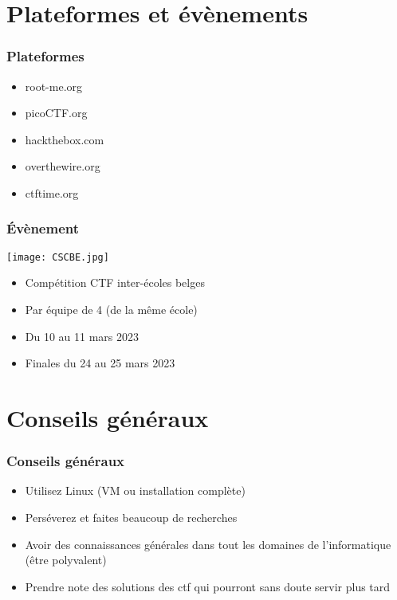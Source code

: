 \documentclass{beamer}
\begin{document}

\section{Plateformes et évènements}

\begin{frame}\frametitle{Plateformes}
    \begin{itemize}
        \item root-me.org
        \item picoCTF.org        
        \item hackthebox.com
        \item overthewire.org
        \item ctftime.org
    \end{itemize}
\end{frame}



\begin{frame}
\frametitle{Évènement}
\begin{center}
    \texttt{[image: CSCBE.jpg]}
\end{center}

\begin{itemize}
    \item Compétition CTF inter-écoles belges\\
    \item Par équipe de 4 (de la même école)\\
    \item Du 10 au 11 mars 2023
    \item Finales du 24 au 25 mars 2023
\end{itemize}

    
\end{frame}

{

}
\section{Conseils généraux}

\begin{frame}
\frametitle{Conseils généraux}

\begin{itemize}
    \item Utilisez Linux (VM ou installation complète)
    \pause
    \item Perséverez et faites beaucoup de recherches
    \pause
    \item Avoir des connaissances générales dans tout les domaines de l'informatique (être polyvalent)
    \pause
    \item Prendre note des solutions des ctf qui pourront sans doute servir plus tard
\end{itemize}

\end{frame}
\end{document}
